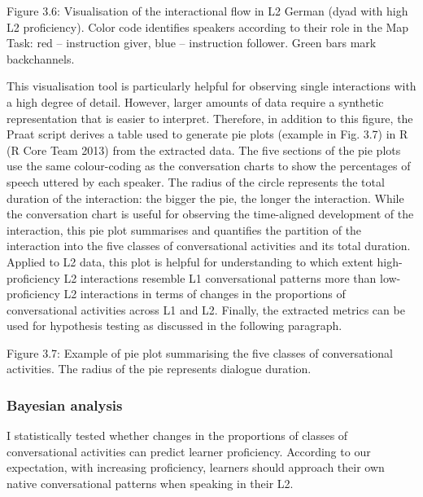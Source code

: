 \begin{stylecaption}
Figure 3.6: Visualisation of the interactional flow in L2 German (dyad with high L2 proficiency). Color code identifies speakers according to their role in the Map Task: red – instruction giver, blue – instruction follower. Green bars mark backchannels.
\end{stylecaption}

\begin{styleStandard}
This visualisation tool is particularly helpful for observing single interactions with a high degree of detail. However, larger amounts of data require a synthetic representation that is easier to interpret. Therefore, in addition to this figure, the Praat script derives a table used to generate pie plots (example in Fig. 3.7) in R (R Core Team 2013) from the extracted data. The five sections of the pie plots use the same colour-coding as the conversation charts to show the percentages of speech uttered by each speaker. The radius of the circle represents the total duration of the interaction: the bigger the pie, the longer the interaction. While the conversation chart is useful for observing the time-aligned development of the interaction, this pie plot summarises and quantifies the partition of the interaction into the five classes of conversational activities and its total duration. Applied to L2 data, this plot is helpful for understanding to which extent high-proficiency L2 interactions resemble L1 conversational patterns more than low-proficiency L2 interactions in terms of changes in the proportions of conversational activities across L1 and L2. Finally, the extracted metrics can be used for hypothesis testing as discussed in the following paragraph.
\end{styleStandard}

\clearpage\begin{styleStandard}
  [Warning: Image ignored] %
 
\end{styleStandard}

\begin{stylecaption}
Figure 3.7: Example of pie plot summarising the five classes of conversational activities. The radius of the pie represents dialogue duration.
\end{stylecaption}

\subsubsection{Bayesian analysis}
\hypertarget{Toc191305934}{}\begin{styleStandard}
I statistically tested whether changes in the proportions of classes of conversational activities can predict learner proficiency. According to our expectation, with increasing proficiency, learners should approach their own native conversational patterns when speaking in their L2.
\end{styleStandard}

